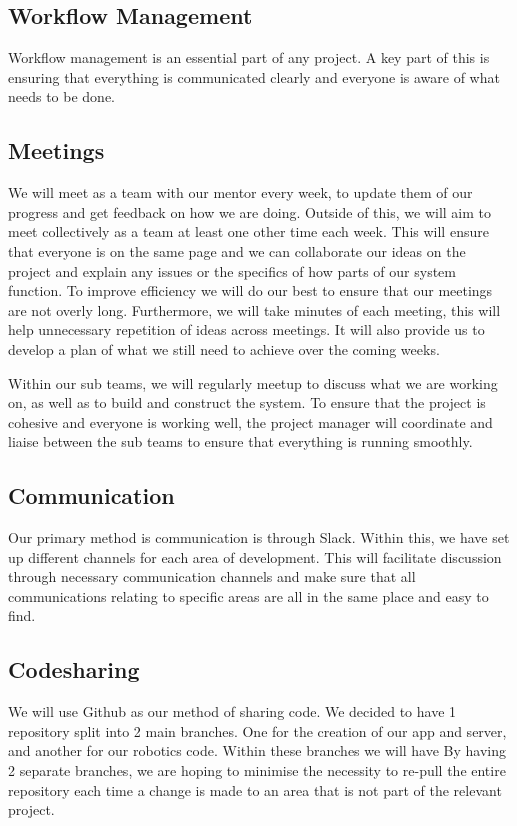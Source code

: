     
    \subsection{Workflow Management}
    Workflow management is an essential part of any project. A key part of this is ensuring that everything is communicated clearly and everyone is aware of what needs to be done. 
    
    \subsection{Meetings}
    We will meet as a team with our mentor every week, to update them of our progress and get feedback on how we are doing. Outside of this, we will aim to meet collectively as a team at least one other time each week. This will ensure that everyone is on the same page and we can collaborate our ideas on the project and explain any issues or the specifics of how parts of our system function. To improve efficiency we will do our best to ensure that our meetings are not overly long. Furthermore, we will take minutes of each meeting, this will help unnecessary repetition of ideas across meetings. It will also provide us to develop a plan of what we still need to achieve over the coming weeks. \par
Within our sub teams, we will regularly meetup to discuss what we are working on, as well as to build and construct the system. To ensure that the project is cohesive and everyone is working well, the project manager will coordinate and liaise between the sub teams to ensure that everything is running smoothly.

    \subsection{Communication}
    Our primary method is communication is through Slack. Within this, we have set up different channels for each area of development. This will facilitate discussion through necessary communication channels and make sure that all communications relating to specific areas are all in the same place and easy to find.

    \subsection{Codesharing}
    We will use Github as our method of sharing code. We decided to have 1 repository split into 2 main branches. One for the creation of our app and server, and another for our robotics code. Within these branches we will have  By having 2 separate branches, we are hoping to minimise the necessity to re-pull the entire repository each time a change is made to an area that is not part of the relevant project.

